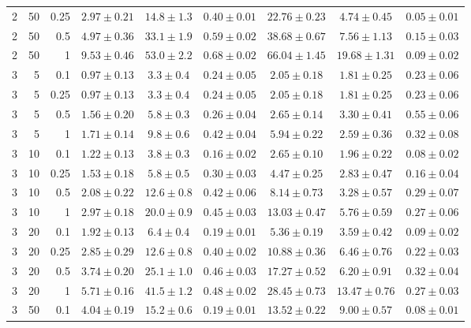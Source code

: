 \begin{table}[htbp]
\begin{tabular}{@{}rrrcccccc@{}}
2 & 50 & 0.25 & $2.97 \pm 0.21$ & $14.8 \pm 1.3$ & $0.40 \pm 0.01$ & $22.76 \pm 0.23$ & $4.74 \pm 0.45$ & $0.05 \pm 0.01$ \\
2 & 50 & 0.5 & $4.97 \pm 0.36$ & $33.1 \pm 1.9$ & $0.59 \pm 0.02$ & $38.68 \pm 0.67$ & $7.56 \pm 1.13$ & $0.15 \pm 0.03$ \\
2 & 50 & 1 & $9.53 \pm 0.46$ & $53.0 \pm 2.2$ & $0.68 \pm 0.02$ & $66.04 \pm 1.45$ & $19.68 \pm 1.31$ & $0.09 \pm 0.02$ \\
\midrule
3 & 5 & 0.1 & $0.97 \pm 0.13$ & $3.3 \pm 0.4$ & $0.24 \pm 0.05$ & $2.05 \pm 0.18$ & $1.81 \pm 0.25$ & $0.23 \pm 0.06$ \\
3 & 5 & 0.25 & $0.97 \pm 0.13$ & $3.3 \pm 0.4$ & $0.24 \pm 0.05$ & $2.05 \pm 0.18$ & $1.81 \pm 0.25$ & $0.23 \pm 0.06$ \\
3 & 5 & 0.5 & $1.56 \pm 0.20$ & $5.8 \pm 0.3$ & $0.26 \pm 0.04$ & $2.65 \pm 0.14$ & $3.30 \pm 0.41$ & $0.55 \pm 0.06$ \\
3 & 5 & 1 & $1.71 \pm 0.14$ & $9.8 \pm 0.6$ & $0.42 \pm 0.04$ & $5.94 \pm 0.22$ & $2.59 \pm 0.36$ & $0.32 \pm 0.08$ \\
3 & 10 & 0.1 & $1.22 \pm 0.13$ & $3.8 \pm 0.3$ & $0.16 \pm 0.02$ & $2.65 \pm 0.10$ & $1.96 \pm 0.22$ & $0.08 \pm 0.02$ \\
3 & 10 & 0.25 & $1.53 \pm 0.18$ & $5.8 \pm 0.5$ & $0.30 \pm 0.03$ & $4.47 \pm 0.25$ & $2.83 \pm 0.47$ & $0.16 \pm 0.04$ \\
3 & 10 & 0.5 & $2.08 \pm 0.22$ & $12.6 \pm 0.8$ & $0.42 \pm 0.06$ & $8.14 \pm 0.73$ & $3.28 \pm 0.57$ & $0.29 \pm 0.07$ \\
3 & 10 & 1 & $2.97 \pm 0.18$ & $20.0 \pm 0.9$ & $0.45 \pm 0.03$ & $13.03 \pm 0.47$ & $5.76 \pm 0.59$ & $0.27 \pm 0.06$ \\
3 & 20 & 0.1 & $1.92 \pm 0.13$ & $6.4 \pm 0.4$ & $0.19 \pm 0.01$ & $5.36 \pm 0.19$ & $3.59 \pm 0.42$ & $0.09 \pm 0.02$ \\
3 & 20 & 0.25 & $2.85 \pm 0.29$ & $12.6 \pm 0.8$ & $0.40 \pm 0.02$ & $10.88 \pm 0.36$ & $6.46 \pm 0.76$ & $0.22 \pm 0.03$ \\
3 & 20 & 0.5 & $3.74 \pm 0.20$ & $25.1 \pm 1.0$ & $0.46 \pm 0.03$ & $17.27 \pm 0.52$ & $6.20 \pm 0.91$ & $0.32 \pm 0.04$ \\
3 & 20 & 1 & $5.71 \pm 0.16$ & $41.5 \pm 1.2$ & $0.48 \pm 0.02$ & $28.45 \pm 0.73$ & $13.47 \pm 0.76$ & $0.27 \pm 0.03$ \\
3 & 50 & 0.1 & $4.04 \pm 0.19$ & $15.2 \pm 0.6$ & $0.19 \pm 0.01$ & $13.52 \pm 0.22$ & $9.00 \pm 0.57$ & $0.08 \pm 0.01$ \\

\end{tabular}
\end{table}
